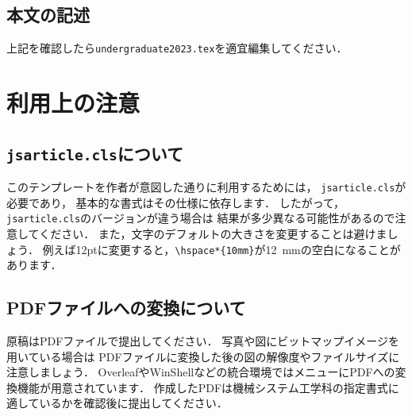 \documentclass[twocolumn]{jsarticle}
\begin{document}
\subsection{本文の記述}
上記を確認したら\texttt{undergraduate2023.tex}を適宜編集してください．


\section{利用上の注意}

\subsection{\texttt{jsarticle.cls}について}
このテンプレートを作者が意図した通りに利用するためには，
\texttt{jsarticle.cls}\cite{Okumura2023}が必要であり，
基本的な書式はその仕様に依存します．
したがって，\texttt{jsarticle.cls}のバージョンが違う場合は
結果が多少異なる可能性があるので注意してください．
また，文字のデフォルトの大きさを変更することは避けましょう．
例えば12ptに変更すると，\verb+\hspace*{10mm}+が12~mmの空白になることがあります．

\subsection{PDFファイルへの変換について}
原稿はPDFファイルで提出してください．
写真や図にビットマップイメージを用いている場合は
PDFファイルに変換した後の図の解像度やファイルサイズに注意しましょう．
OverleafやWinShellなどの統合環境ではメニューにPDFへの変換機能が用意されています．
作成したPDFは機械システム工学科の指定書式に適しているかを確認後に提出してください．


%

\end{document}
